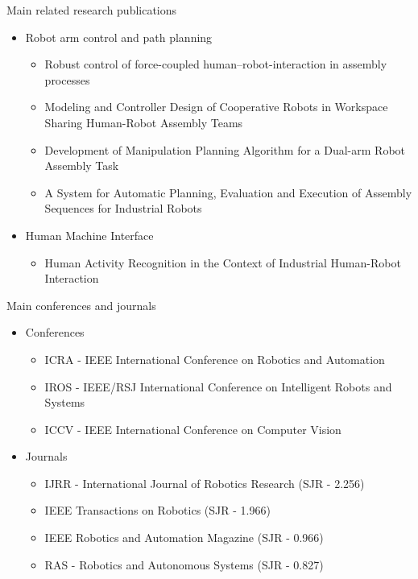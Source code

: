 \begin{frame}{Main related research publications}
	\begin{itemize}
		\item Robot arm control and path planning
		\begin{itemize}
			\item Robust control of force-coupled human–robot-interaction in assembly processes
			\item Modeling and Controller Design of Cooperative Robots in Workspace Sharing Human-Robot Assembly Teams
			\item Development of Manipulation Planning Algorithm for a Dual-arm Robot Assembly Task
			\item A System for Automatic Planning, Evaluation and Execution of Assembly Sequences for Industrial Robots
		\end{itemize}
		
		\item Human Machine Interface
		\begin{itemize}
			\item Human Activity Recognition in the Context of Industrial Human-Robot Interaction
		\end{itemize}
	\end{itemize}
\end{frame}

\begin{frame}{Main conferences and journals}
	\begin{itemize}
		\item Conferences
		\begin{itemize}
			\item ICRA - IEEE International Conference on Robotics and Automation
			\item IROS - IEEE/RSJ International Conference on Intelligent Robots and Systems
			\item ICCV - IEEE International Conference on Computer Vision
		\end{itemize}
		\item Journals
		\begin{itemize}
			\item IJRR - International Journal of Robotics Research (SJR - 2.256)
			\item IEEE Transactions on Robotics (SJR - 1.966)
			\item IEEE Robotics and Automation Magazine (SJR - 0.966)
			\item RAS - Robotics and Autonomous Systems (SJR - 0.827)
		\end{itemize}
	\end{itemize}

\end{frame}

